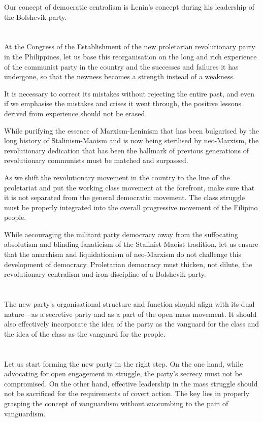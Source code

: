 \documentclass[a4paper,11pt,onesided]{report}
\begin{document}
Our concept of democratic centralism 
is Lenin's concept during his leadership of the Bolshevik party.

\section{}
At the Congress of the Establishment 
of the new proletarian revolutionary party in the Philippines, 
let us base this reorganisation 
on the long and rich experience of the communist party 
in the country and the successes and failures it has undergone,
so that the newness becomes a strength instead of a weakness.

It is necessary to correct 
its mistakes 
without rejecting the entire past,
and even if we emphasise the mistakes and crises it went through, 
the positive lessons derived from experience should not be erased.

While purifying the essence of Marxism-Leninism 
that has been bulgarised by the long history of Stalinism-Maoism 
and is now being sterilised by neo-Marxism, 
the revolutionary dedication that has been 
the hallmark of previous generations of revolutionary communists 
must be matched and surpassed.

As we shift the revolutionary movement in the country 
to the line of the proletariat and put the working class movement 
at the forefront, 
make sure that it is not separated 
from the general democratic movement. 
The class struggle must be properly integrated 
into the overall progressive movement of the Filipino people.

While aecouraging the militant party democracy away
from the suffocating absolutism and blinding fanaticism 
of the Stalinist-Maoist tradition, 
let us ensure that the anarchism and liquidationism 
of neo-Marxism do not challenge this development of democracy. 
Proletarian democracy must thicken, not dilute, the revolutionary centralism 
and iron discipline of a Bolshevik party.

\section{}
The new party's organisational structure and function
should align with its dual nature---as 
a secretive party and as 
a part of the open mass movement. 
It should also effectively incorporate 
the idea of the party 
as the vanguard for the class and 
the idea of the class as the vanguard for the people.

\section{}
Let us start forming the new party in the right step. 
On the one hand,
while advocating for open engagement in struggle, 
the party's secrecy must not be compromised.
On the other hand, 
effective leadership in the mass struggle should not be sacrificed 
for the requirements of covert action. 
The key lies in properly grasping the concept of vanguardism 
without succumbing to the pain of vanguardism.
\end{document}
